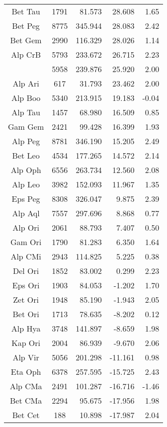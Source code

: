 \begin{tabular}{ccrrr}
Bet Tau &    1791 &   81.573 &   28.608 &   1.65 \\ 
Bet Peg &    8775 &  345.944 &   28.083 &   2.42 \\ 
Bet Gem &    2990 &  116.329 &   28.026 &   1.14 \\ 
Alp CrB &    5793 &  233.672 &   26.715 &   2.23 \\ 
        &    5958 &  239.876 &   25.920 &   2.00 \\ 
Alp Ari &     617 &   31.793 &   23.462 &   2.00 \\ 
\rowcolor[gray]{0.8}  Alp Boo &    5340 &  213.915 &   19.183 &  -0.04 \\ 
\rowcolor[gray]{0.8}  Alp Tau &    1457 &   68.980 &   16.509 &   0.85 \\ 
Gam Gem &    2421 &   99.428 &   16.399 &   1.93 \\ 
Alp Peg &    8781 &  346.190 &   15.205 &   2.49 \\ 
Bet Leo &    4534 &  177.265 &   14.572 &   2.14 \\ 
Alp Oph &    6556 &  263.734 &   12.560 &   2.08 \\ 
Alp Leo &    3982 &  152.093 &   11.967 &   1.35 \\ 
Eps Peg &    8308 &  326.047 &    9.875 &   2.39 \\ 
\rowcolor[gray]{0.8}  Alp Aql &    7557 &  297.696 &    8.868 &   0.77 \\ 
\rowcolor[gray]{0.8}  Alp Ori &    2061 &   88.793 &    7.407 &   0.50 \\ 
Gam Ori &    1790 &   81.283 &    6.350 &   1.64 \\ 
\rowcolor[gray]{0.8}  Alp CMi &    2943 &  114.825 &    5.225 &   0.38 \\ 
Del Ori &    1852 &   83.002 &    0.299 &   2.23 \\ 
Eps Ori &    1903 &   84.053 &   -1.202 &   1.70 \\ 
Zet Ori &    1948 &   85.190 &   -1.943 &   2.05 \\ 
\rowcolor[gray]{0.8}  Bet Ori &    1713 &   78.635 &   -8.202 &   0.12 \\ 
Alp Hya &    3748 &  141.897 &   -8.659 &   1.98 \\ 
Kap Ori &    2004 &   86.939 &   -9.670 &   2.06 \\ 
\rowcolor[gray]{0.8}  Alp Vir &    5056 &  201.298 &  -11.161 &   0.98 \\ 
Eta Oph &    6378 &  257.595 &  -15.725 &   2.43 \\ 
\rowcolor[gray]{0.8}  Alp CMa &    2491 &  101.287 &  -16.716 &  -1.46 \\ 
Bet CMa &    2294 &   95.675 &  -17.956 &   1.98 \\ 
Bet Cet &     188 &   10.898 &  -17.987 &   2.04 \\ 
\hline
\end{tabular}
